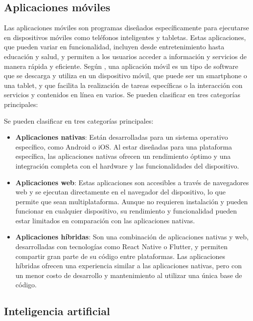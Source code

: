 \subsection{Aplicaciones móviles }
Las aplicaciones móviles son programas diseñados específicamente para ejecutarse en dispositivos móviles como teléfonos inteligentes y tabletas. Estas aplicaciones, que pueden variar en funcionalidad, incluyen desde entretenimiento hasta educación y salud, y permiten a los usuarios acceder a información y servicios de manera rápida y eficiente. Según \parencite{herazo2023}, una aplicación móvil es un tipo de software que se descarga y utiliza en un dispositivo móvil, que puede ser un smartphone o una tablet, y que facilita la realización de tareas específicas o la interacción con servicios y contenidos en línea en varios. Se pueden clasificar en tres categorías principales:

Se pueden clasificar en tres categorías principales:

\begin{itemize}
    \item \textbf{Aplicaciones nativas}: Están desarrolladas para un sistema operativo específico, como Android o iOS. Al estar diseñadas para una plataforma específica, las aplicaciones nativas ofrecen un rendimiento óptimo y una integración completa con el hardware y las funcionalidades del dispositivo.
    
    \item \textbf{Aplicaciones web}: Estas aplicaciones son accesibles a través de navegadores web y se ejecutan directamente en el navegador del dispositivo, lo que permite que sean multiplataforma. Aunque no requieren instalación y pueden funcionar en cualquier dispositivo, su rendimiento y funcionalidad pueden estar limitados en comparación con las aplicaciones nativas.
    
    \item \textbf{Aplicaciones híbridas}: Son una combinación de aplicaciones nativas y web, desarrolladas con tecnologías como React Native o Flutter, y permiten compartir gran parte de su código entre plataformas. Las aplicaciones híbridas ofrecen una experiencia similar a las aplicaciones nativas, pero con un menor costo de desarrollo y mantenimiento al utilizar una única base de código.
\end{itemize}

 \subsection{Inteligencia artificial}

